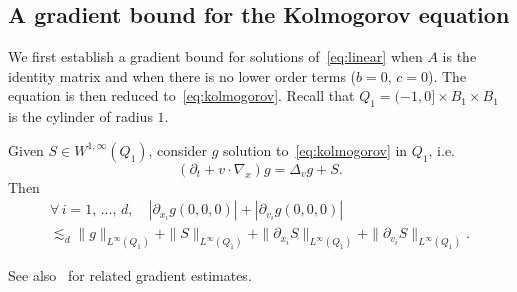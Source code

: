 \documentclass[AHL,Unicode,longabstracts,published]{cedram}
\let\oldforall\forall
\renewcommand*{\forall}{\mathrel{\oldforall}}
\begin{document}
\subsection{A gradient bound for the Kolmogorov equation}

We first establish a gradient bound for solutions of~\eqref{eq:linear} when $A$ is the identity matrix and when there is no lower order terms ($b=0$, $c=0$). The equation is then reduced to~\eqref{eq:kolmogorov}. Recall that $Q_1= (-1,0] \times B_1 \times B_1$ is the cylinder of radius $1$.

\begin{prop}\label{prop:grad}
Given $S \in W^{1,\infty} (Q_1)$, consider $g$ solution to~\eqref{eq:kolmogorov} in $Q_1$, i.e.
\[
(\partial_t + v \cdot \nabla_x)g = \Delta_v g + S.
\]
Then
\begin{multline*}
\forall \, i =1,\,\dots,\,d, \quad \left|\partial_{x_i} g(0,0,0)\right| + |\partial_{v_i} g(0,0,0)| \\
\lesssim_{d}\|g\|_{L^\infty(Q_1)}+\|S\|_{L^\infty(Q_1)} +\|\partial_{x_i} S\|_{L^\infty(Q_1)}+\|\partial_{v_i} S\|_{L^\infty(Q_1)}.
\end{multline*}
\end{prop}

\begin{rema}
See also~\cite{baudoin2017,guillin2012} for related gradient estimates.
\end{rema}
\end{document}
